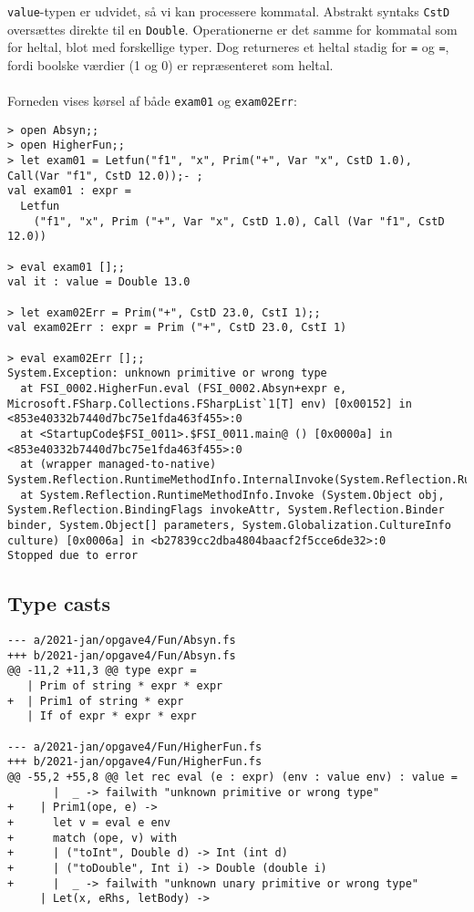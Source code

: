 \texttt{value}-typen er udvidet, så vi kan processere kommatal. Abstrakt syntaks \texttt{CstD} oversættes direkte til en \texttt{Double}. Operationerne er det samme for kommatal som for heltal, blot med forskellige typer. Dog returneres et heltal stadig for \texttt{=} og \texttt{=}, fordi boolske værdier (1 og 0) er repræsenteret som heltal.
\\\\
Forneden vises kørsel af både \texttt{exam01} og \texttt{exam02Err}:

\begin{verbatim}
> open Absyn;;
> open HigherFun;;
> let exam01 = Letfun("f1", "x", Prim("+", Var "x", CstD 1.0), Call(Var "f1", CstD 12.0));- ;
val exam01 : expr =
  Letfun
    ("f1", "x", Prim ("+", Var "x", CstD 1.0), Call (Var "f1", CstD 12.0))

> eval exam01 [];;
val it : value = Double 13.0

> let exam02Err = Prim("+", CstD 23.0, CstI 1);;
val exam02Err : expr = Prim ("+", CstD 23.0, CstI 1)

> eval exam02Err [];;
System.Exception: unknown primitive or wrong type
  at FSI_0002.HigherFun.eval (FSI_0002.Absyn+expr e, Microsoft.FSharp.Collections.FSharpList`1[T] env) [0x00152] in <853e40332b7440d7bc75e1fda463f455>:0
  at <StartupCode$FSI_0011>.$FSI_0011.main@ () [0x0000a] in <853e40332b7440d7bc75e1fda463f455>:0
  at (wrapper managed-to-native) System.Reflection.RuntimeMethodInfo.InternalInvoke(System.Reflection.RuntimeMethodInfo,object,object[],System.Exception&)
  at System.Reflection.RuntimeMethodInfo.Invoke (System.Object obj, System.Reflection.BindingFlags invokeAttr, System.Reflection.Binder binder, System.Object[] parameters, System.Globalization.CultureInfo culture) [0x0006a] in <b27839cc2dba4804baacf2f5cce6de32>:0
Stopped due to error
\end{verbatim}

\subsection{Type casts}

\begin{verbatim}
--- a/2021-jan/opgave4/Fun/Absyn.fs
+++ b/2021-jan/opgave4/Fun/Absyn.fs
@@ -11,2 +11,3 @@ type expr =
   | Prim of string * expr * expr
+  | Prim1 of string * expr
   | If of expr * expr * expr

--- a/2021-jan/opgave4/Fun/HigherFun.fs
+++ b/2021-jan/opgave4/Fun/HigherFun.fs
@@ -55,2 +55,8 @@ let rec eval (e : expr) (env : value env) : value =
       |  _ -> failwith "unknown primitive or wrong type"
+    | Prim1(ope, e) ->
+      let v = eval e env
+      match (ope, v) with
+      | ("toInt", Double d) -> Int (int d)
+      | ("toDouble", Int i) -> Double (double i)
+      |  _ -> failwith "unknown unary primitive or wrong type"
     | Let(x, eRhs, letBody) -> 
\end{verbatim}

